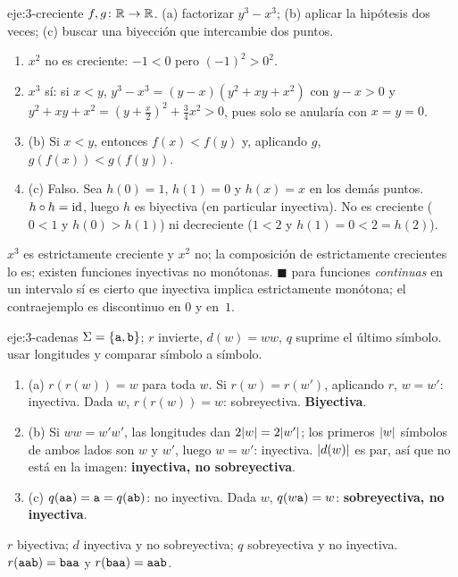 \begin{solucion}{eje:3-creciente}
\datos $f,g\colon\mathbb{R}\to\mathbb{R}$.
\planteamiento (a) factorizar $y^{3}-x^{3}$; (b) aplicar la hipótesis dos veces; (c) buscar una biyección que intercambie dos puntos.
\pasos
\begin{enumerate}[label=\arabic*.]
  \item $x^{2}$ no es creciente: $-1<0$ pero $(-1)^{2}>0^{2}$.
  \item $x^{3}$ sí: si $x<y$, $y^{3}-x^{3}=(y-x)(y^{2}+xy+x^{2})$ con $y-x>0$ y $y^{2}+xy+x^{2}=(y+\tfrac x2)^{2}+\tfrac34x^{2}>0$, pues solo se anularía con $x=y=0$.
  \item (b) Si $x<y$, entonces $f(x)<f(y)$ y, aplicando $g$, $g(f(x))<g(f(y))$.
  \item (c) Falso. Sea $h(0)=1$, $h(1)=0$ y $h(x)=x$ en los demás puntos. $h\circ h=\mathrm{id}$, luego $h$ es biyectiva (en particular inyectiva). No es creciente ($0<1$ y $h(0)>h(1)$) ni decreciente ($1<2$ y $h(1)=0<2=h(2)$).
\end{enumerate}
\resultado $x^{3}$ es estrictamente creciente y $x^{2}$ no; la composición de estrictamente crecientes lo es; existen funciones inyectivas no monótonas. \hfill$\blacksquare$
\comprobacion para funciones \emph{continuas} en un intervalo sí es cierto que inyectiva implica estrictamente monótona; el contraejemplo es discontinuo en $0$ y en~$1$.
\end{solucion}

\begin{solucion}{eje:3-cadenas}
\datos $\Sigma=\{\texttt{a},\texttt{b}\}$; $r$ invierte, $d(w)=ww$, $q$ suprime el último símbolo.
\planteamiento usar longitudes y comparar símbolo a símbolo.
\pasos
\begin{enumerate}[label=\arabic*.]
  \item (a) $r(r(w))=w$ para toda $w$. Si $r(w)=r(w')$, aplicando $r$, $w=w'$: inyectiva. Dada $w$, $r(r(w))=w$: sobreyectiva. \textbf{Biyectiva}.
  \item (b) Si $ww=w'w'$, las longitudes dan $2\lvert w\rvert=2\lvert w'\rvert$; los primeros $\lvert w\rvert$ símbolos de ambos lados son $w$ y $w'$, luego $w=w'$: inyectiva. $\lvert d(w)\rvert$ es par, así que  no está en la imagen: \textbf{inyectiva, no sobreyectiva}.
  \item (c) $q(\texttt{aa})=\texttt{a}=q(\texttt{ab})$: no inyectiva. Dada $w$, $q(w\texttt{a})=w$: \textbf{sobreyectiva, no inyectiva}.
\end{enumerate}
\resultado $r$ biyectiva; $d$ inyectiva y no sobreyectiva; $q$ sobreyectiva y no inyectiva.
\comprobacion $r(\texttt{aab})=\texttt{baa}$ y $r(\texttt{baa})=\texttt{aab}$.
\end{solucion}


